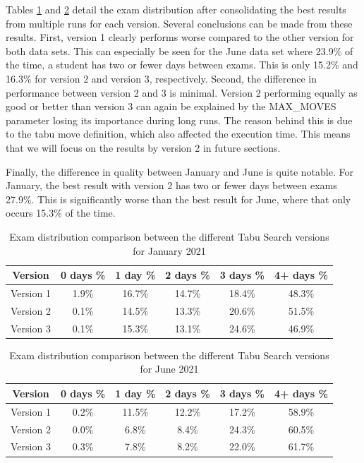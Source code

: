 Tables \ref{tab:version_comparison_sem1} and \ref{tab:version_comparison_sem2} detail the exam distribution after consolidating the best results from multiple runs for each version. Several conclusions can be made from these results. First, version 1 clearly performs worse compared to the other version for both data sets. This can especially be seen for the June data set where 23.9\% of the time, a student has two or fewer days between exams. This is only 15.2\% and 16.3\% for version 2 and version 3, respectively. Second, the difference in performance between version 2 and 3 is minimal. Version 2 performing equally as good or better than version 3 can again be explained by the MAX\_MOVES parameter losing its importance during long runs. The reason behind this is due to the tabu move definition, which also affected the execution time. This means that we will focus on the results by version 2 in future sections.

Finally, the difference in quality between January and June is quite notable. For January, the best result with version 2 has two or fewer days between exams 27.9\%. This is significantly worse than the best result for June, where that only occurs 15.3\% of the time.

\begin{table}[h]
	\caption{Exam distribution comparison between the different Tabu Search versions for January 2021}
	\label{tab:version_comparison_sem1}
	\centering
	\begin{tabular}{c c c c c c}
		\hline
  	\textbf{Version}	&
   \textbf{0 days \% } &
    \textbf{1 day \% } & 
    \textbf{2 days \% } &
    \textbf{3 days \% } & 
    \textbf{4+ days \%}\\ \hline
    Version 1 & 1.9\% & 16.7\% & 14.7\% & 18.4\% & 48.3\% \\
    Version 2 & 0.1\% & 14.5\% & 13.3\% & 20.6\% & 51.5\% \\
    Version 3 & 0.1\% & 15.3\% & 13.1\% & 24.6\% & 46.9\% \\
        \hline
	\end{tabular}
\end{table}

\begin{table}[h]
	\caption{Exam distribution comparison between the different Tabu Search versions for June 2021}
	\label{tab:version_comparison_sem2}
	\centering
	\begin{tabular}{c c c c c c}
		\hline
  	\textbf{Version}	&
   \textbf{0 days \% } &
    \textbf{1 day \% } & 
    \textbf{2 days \% } &
    \textbf{3 days \% } & 
    \textbf{4+ days \%}\\ \hline
    Version 1 & 0.2\% & 11.5\% & 12.2\% & 17.2\% & 58.9\% \\
    Version 2 & 0.0\% & 6.8\% & 8.4\% & 24.3\% & 60.5\% \\
    Version 3 & 0.3\% & 7.8\% & 8.2\% & 22.0\% & 61.7\% \\
        \hline
	\end{tabular}
\end{table}
 \label{subsec:versions}
